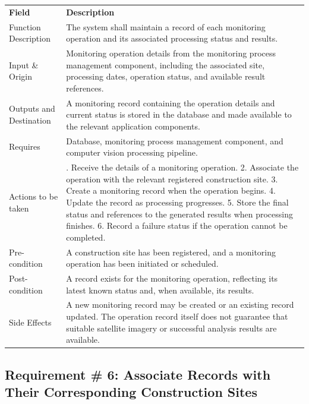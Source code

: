 \documentclass[12pt,a4paper]{report}
\begin{document}
\begin{longtable}[]{@{}
  >{\raggedright\arraybackslash}p{}
  >{\raggedright\arraybackslash}p{}@{}}
\toprule\noalign{}
\endhead
\bottomrule\noalign{}
\endlastfoot
\textbf{Field} & \textbf{Description} \\
Function Description & The system shall maintain a record of each
monitoring operation and its associated processing status and
results. \\
Input \& Origin & Monitoring operation details from the monitoring
process management component, including the associated site, processing
dates, operation status, and available result references. \\
Outputs and Destination & A monitoring record containing the operation
details and current status is stored in the database and made available
to the relevant application components. \\
Requires & Database, monitoring process management component, and
computer vision processing pipeline. \\
Actions to be taken & 1. Receive the details of a monitoring operation.
2. Associate the operation with the relevant registered construction
site. 3. Create a monitoring record when the operation begins. 4. Update
the record as processing progresses. 5. Store the final status and
references to the generated results when processing finishes. 6. Record
a failure status if the operation cannot be completed. \\
Pre-condition & A construction site has been registered, and a
monitoring operation has been initiated or scheduled. \\
Post-condition & A record exists for the monitoring operation,
reflecting its latest known status and, when available, its results. \\
Side Effects & A new monitoring record may be created or an existing
record updated. The operation record itself does not guarantee that
suitable satellite imagery or successful analysis results are
available. \\
\end{longtable}

\subsection{Requirement \# 6: Associate Records with Their
Corresponding Construction
Sites}\label{requirement-6-associate-records-with-their-corresponding-construction-sites}
\end{document}
